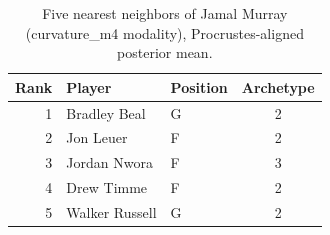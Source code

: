 \begin{table}[htbp]
  \centering\small
  \begin{tabular}{rllc}
    \toprule
    Rank & Player & Position & Archetype \\
    \midrule
    1 & Bradley Beal & G & 2 \\
    2 & Jon Leuer & F & 2 \\
    3 & Jordan Nwora & F & 3 \\
    4 & Drew Timme & F & 2 \\
    5 & Walker Russell & G & 2 \\
    \bottomrule
  \end{tabular}
  \caption{Five nearest neighbors of Jamal Murray (curvature_m4 modality), Procrustes-aligned posterior mean.}
  \label{tab:Jamal_Murray_neighbors_curvature_m4}
\end{table}

